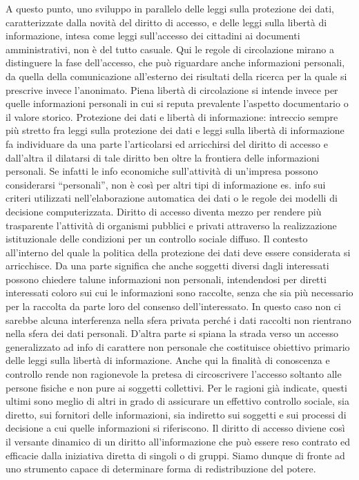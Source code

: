 A questo punto, uno sviluppo in parallelo delle leggi sulla protezione dei dati, caratterizzate dalla novità del diritto di accesso, e delle leggi sulla libertà di informazione, intesa come leggi sull’accesso dei cittadini ai documenti amministrativi, non è del tutto casuale.
Qui le regole di circolazione mirano a distinguere la fase dell’accesso, che può riguardare anche informazioni personali, da quella della comunicazione all’esterno dei risultati della ricerca per la quale si prescrive invece l’anonimato.
Piena libertà di circolazione si intende invece per quelle informazioni personali in cui si reputa prevalente l’aspetto documentario o il valore storico.
Protezione dei dati e libertà di informazione:
intreccio sempre più stretto fra leggi sulla protezione dei dati e leggi sulla libertà di informazione fa individuare da una parte l’articolarsi ed arricchirsi del diritto di accesso e dall’altra il dilatarsi di tale diritto ben oltre la frontiera delle informazioni personali. Se infatti le info economiche sull’attività di un’impresa possono considerarsi “personali”, non è così per altri tipi di informazione es. info sui criteri utilizzati nell’elaborazione automatica dei dati o le regole dei modelli di decisione computerizzata. Diritto di accesso diventa mezzo per rendere più trasparente l’attività di organismi pubblici e privati attraverso la realizzazione istituzionale delle condizioni per un controllo sociale diffuso. 
Il contesto all’interno del quale la politica della protezione dei dati deve essere considerata si arricchisce.
Da una parte significa che anche soggetti diversi dagli interessati possono chiedere talune informazioni non personali, intendendosi per diretti interessati coloro sui cui le informazioni sono raccolte, senza che sia più necessario per la raccolta da parte loro del consenso dell’interessato. In questo caso non ci sarebbe alcuna interferenza nella sfera privata perché i dati raccolti non rientrano nella sfera dei dati personali.
D’altra parte si spiana la strada verso un accesso generalizzato ad info di carattere non personale che costituisce obiettivo primario delle leggi sulla libertà di informazione.
Anche qui la finalità di conoscenza e controllo rende non ragionevole la pretesa di circoscrivere l’accesso soltanto alle persone fisiche e non pure ai soggetti collettivi. Per le ragioni già indicate, questi ultimi sono meglio di altri in grado di assicurare un effettivo controllo sociale, sia diretto, sui fornitori delle informazioni, sia indiretto sui soggetti e sui processi di decisione a cui quelle informazioni si riferiscono. Il diritto di accesso diviene così il versante dinamico di un diritto all’informazione che può essere reso contrato ed efficacie dalla iniziativa diretta di singoli o di gruppi. Siamo dunque di fronte ad uno strumento capace di determinare forma di redistribuzione del potere.
